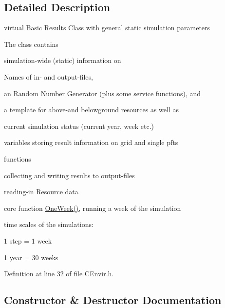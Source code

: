 \subsection{Detailed Description}
virtual Basic Results Class with general static simulation parameters 

The class contains
\begin{DoxyItemize}
\item simulation-\/wide (static) information on
\begin{DoxyItemize}
\item Names of in-\/ and output-\/files,
\item an Random Number Generator (plus some service functions), and
\item a template for above-\/and belowground resources as well as
\item current simulation status (current year, week etc.)
\end{DoxyItemize}
\item variables storing result information on grid and single pfts
\item functions
\begin{DoxyItemize}
\item collecting and writing results to output-\/files
\item reading-\/in Resource data
\item core function \mbox{\hyperlink{class_c_envir_aaf79409fdf193613b40fb45a66dba4ee}{One\+Week()}}, running a week of the simulation \begin{DoxyParagraph}{time scales of the simulations\+:}

\end{DoxyParagraph}

\end{DoxyItemize}
\end{DoxyItemize}

1 step = 1 week
\begin{DoxyItemize}
\item 1 year = 30 weeks 
\end{DoxyItemize}

Definition at line 32 of file C\+Envir.\+h.



\subsection{Constructor \& Destructor Documentation}
\mbox{\label{class_c_envir_ae4ba8d566cbfd0e6ae7066f88172e982}} 
